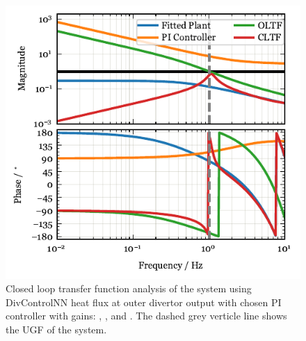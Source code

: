 \begin{figure}[!h]
 \centering
 \includegraphics[width=\linewidth]{figures/SM_LoopStability.pdf}
 \caption{Closed loop transfer function analysis of the system using DivControlNN heat flux at outer divertor output with chosen PI controller with gains: \SMKp, \SMTi, and \SMstau.
The dashed grey verticle line shows the \ac{UGF} of the system.}
\label{fig:cltf_sm}
\end{figure}